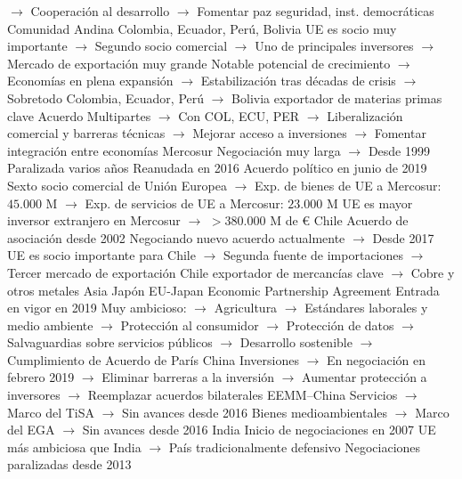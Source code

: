 \documentclass{nuevotema}
\begin{document}
\begin{esquemal}
				\4[] $\to$ Cooperación al desarrollo
				\4[] $\to$ Fomentar paz seguridad, inst. democráticas
				\4 Comunidad Andina
				\4[] Colombia, Ecuador, Perú, Bolivia
				\4[] UE es socio muy importante
				\4[] $\to$ Segundo socio comercial
				\4[] $\to$ Uno de principales inversores
				\4[] $\to$ Mercado de exportación muy grande
				\4[] Notable potencial de crecimiento
				\4[] $\to$ Economías en plena expansión
				\4[] $\to$ Estabilización tras décadas de crisis
				\4[] $\to$ Sobretodo Colombia, Ecuador, Perú
				\4[] $\to$ Bolivia exportador de materias primas clave
				\4[] Acuerdo Multipartes
				\4[] $\to$ Con COL, ECU, PER
				\4[] $\to$ Liberalización comercial y barreras técnicas
				\4[] $\to$ Mejorar acceso a inversiones
				\4[] $\to$ Fomentar integración entre economías
				\4 Mercosur
				\4[] Negociación muy larga
				\4[] $\to$ Desde 1999
				\4[] Paralizada varios años
				\4[] Reanudada en 2016
				\4[] Acuerdo político en junio de 2019
				\4[] Sexto socio comercial de Unión Europea
				\4[] $\to$ Exp. de bienes de UE a Mercosur: $45.000$ M
				\4[] $\to$ Exp. de servicios de UE a Mercosur: $23.000$ M
				\4[] UE es mayor inversor extranjero en Mercosur
				\4[] $\to$ $>380.000$ M de €
				\4 Chile
				\4[] Acuerdo de asociación desde 2002
				\4[] Negociando nuevo acuerdo actualmente
				\4[] $\to$ Desde 2017
				\4[] UE es socio importante para Chile
				\4[] $\to$ Segunda fuente de importaciones
				\4[] $\to$ Tercer mercado de exportación
				\4[] Chile exportador de mercancías clave
				\4[] $\to$ Cobre y otros metales
			\3 Asia
				\4 Japón
				\4[] EU-Japan Economic Partnership Agreement
				\4[] Entrada en vigor en 2019
				\4[] Muy ambicioso:
				\4[] $\to$ Agricultura
				\4[] $\to$ Estándares laborales y medio ambiente
				\4[] $\to$ Protección al consumidor
				\4[] $\to$ Protección de datos
				\4[] $\to$ Salvaguardias sobre servicios públicos
				\4[] $\to$ Desarrollo sostenible
				\4[] $\to$ Cumplimiento de Acuerdo de París
				\4 China
				\4[] Inversiones
				\4[] $\to$ En negociación en febrero 2019
				\4[] $\to$ Eliminar barreras a la inversión
				\4[] $\to$ Aumentar protección a inversores
				\4[] $\to$ Reemplazar acuerdos bilaterales EEMM--China
				\4[] Servicios
				\4[] $\to$ Marco del TiSA
				\4[] $\to$ Sin avances desde 2016
				\4[] Bienes medioambientales
				\4[] $\to$ Marco del EGA
				\4[] $\to$ Sin avances desde 2016
				\4 India
				\4[] Inicio de negociaciones en 2007
				\4[] UE más ambiciosa que India
				\4[] $\to$ País tradicionalmente defensivo
				\4[] Negociaciones paralizadas desde 2013

\end{esquemal}
\end{document}
